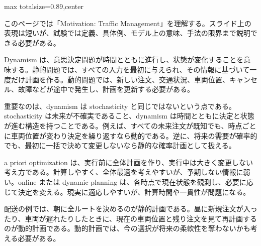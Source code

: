 \begin{minipage}[t]{0.58\textwidth}
\begin{adjustbox}{max totalsize={\textwidth}{0.89\textheight},center}
\begin{minipage}{\textwidth}\scriptsize
{}このページでは「Motivation: Traffic Management」を理解する。スライド上の表現は短いが、試験では定義、具体例、モデル上の意味、手法の限界まで説明できる必要がある。\par
Dynamism は、意思決定問題が時間とともに進行し、状態が変化することを意味する。静的問題では、すべての入力を最初に与えられ、その情報に基づいて一度だけ計画を作る。動的問題では、新しい注文、交通状況、車両位置、キャンセル、故障などが途中で発生し、計画を更新する必要がある。\par
重要なのは、dynamism は stochasticity と同じではないという点である。stochasticity は未来が不確実であること、dynamism は時間とともに決定と状態が進む構造を持つことである。例えば、すべての未来注文が既知でも、時点ごとに車両位置が変わり決定を繰り返すなら動的である。逆に、将来の需要が確率的でも、最初に一括で決めて変更しないなら静的な確率計画として扱える。\par
a priori optimization は、実行前に全体計画を作り、実行中は大きく変更しない考え方である。計算しやすく、全体最適を考えやすいが、予期しない情報に弱い。online または dynamic planning は、各時点で現在状態を観測し、必要に応じて決定を変える。現実に適応しやすいが、計算時間や一貫性が問題になる。\par
配送の例では、朝に全ルートを決めるのが静的計画である。昼に新規注文が入ったり、車両が遅れたりしたときに、現在の車両位置と残り注文を見て再計画するのが動的計画である。動的計画では、今の選択が将来の柔軟性を奪わないかも考える必要がある。\par

\end{minipage}
\end{adjustbox}
\end{minipage}
